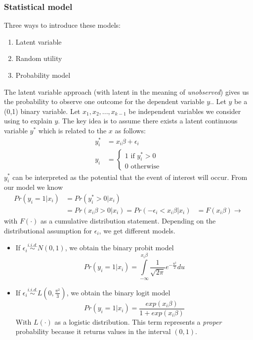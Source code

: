 	\subsubsection{Statistical model}
		Three ways to introduce these models:
		\begin{enumerate}
			\item Latent variable
			\item Random utility
			\item Probability model
		\end{enumerate}
			The latent variable approach (with latent in the meaning of \textit{unobserved}) gives us the probability to observe one outcome for the dependent variable $y$.. Let $y$ be a (0,1) binary variable. Let $x_1,x_2,...,x_{k-1}$ be independent variables we consider using to explain $y$. The key idea is to assume there exists a latent continuous variable $y^*$ which is related to the $x$ as follows:
			\begin{align*}
				y^*_i&=x_i \beta + \epsilon_i\\
				y_i&=\begin{cases}
					1\text{ if } y_i^*>0\\
					0\text{ otherwise}
				\end{cases}
			\end{align*}
			$y^*_i$ can be interpreted as the potential that the event of interest will occur. From our model we know
			\begin{align*}
				Pr(y_i=1|x_i)&=Pr(y_i^*>0|x_i)\\
				&=Pr(x_i \beta > 0 | x_i)=Pr(-\epsilon_i<x_i \beta | x_i)
				&=F(x_i \beta) \longrightarrow
			\end{align*}
			with $F(\cdot)$ as a cumulative distribution statement. Depending on the distributional assumption for $\epsilon_i$, we get different models.
			\begin{itemize}
				\item If $\epsilon_i  \overset{i.i.d.}{\sim}N(0,1)$, we obtain the binary probit model
					\begin{equation*}
						Pr(y_i=1|x_i)=\int\limits_{-\infty}^{x_i \beta} \frac{1}{\sqrt{2 \pi}} e^{-\frac{u^2}{2}} du
					\end{equation*}
				\item If $\epsilon_i  \overset{i.i.d.}{\sim}L(0,\frac{\pi^2}{3})$, we obtain the binary logit model
					\begin{equation*}
					Pr(y_i=1|x_i)=\frac{exp(x_i \beta)}{1+exp(x_i \beta)}
					\end{equation*}
					With $L(\cdot)$ as a logistic distribution. This term represents a \emph{proper} probability because it returns values in the interval $(0,1)$.
			\end{itemize}
